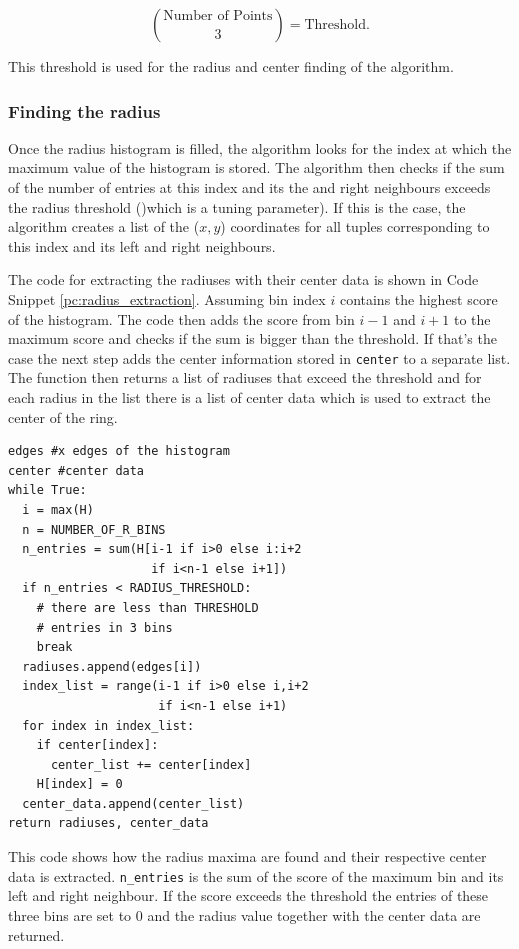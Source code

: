 \documentclass[11pt]{scrreprt}
\begin{document}
\begin{equation}
  \binom{\text{Number of Points}}{3} = \text{Threshold}.
  \label{eq:threshold}
\end{equation}

This threshold is used for the radius and center finding of the algorithm.

\subsubsection{Finding the radius} %
\label{ssub:finding_the_radius}
Once the radius histogram is filled, the algorithm looks for the index at which the maximum value of the histogram is stored. The algorithm
then checks if the sum of the number of entries at this index and its the and right neighbours exceeds the radius threshold ()which is a tuning parameter). If this is the case, the algorithm creates a list of the ($x,y$) coordinates for all tuples corresponding to this index and its left and right neighbours.

The code for extracting the radiuses with their center data is shown in Code Snippet \ref{pc:radius_extraction}. Assuming bin index $i$ 
contains the highest score of the histogram. The code then adds the score from bin $i-1$ and $i+1$ to the maximum score and checks if 
the sum is bigger than the threshold. If that's the case the next step adds the center information stored in \texttt{center} to a separate
list. The function then returns a list of radiuses that exceed the threshold and for each radius in the list there is a list of center data which is used to 
extract the center of the ring.
\begin{codesnippet}
  \begin{lstlisting}
edges #x edges of the histogram
center #center data
while True:
  i = max(H)
  n = NUMBER_OF_R_BINS 
  n_entries = sum(H[i-1 if i>0 else i:i+2 
                    if i<n-1 else i+1])
  if n_entries < RADIUS_THRESHOLD:
    # there are less than THRESHOLD
    # entries in 3 bins
    break
  radiuses.append(edges[i])
  index_list = range(i-1 if i>0 else i,i+2 
                     if i<n-1 else i+1)
  for index in index_list:
    if center[index]:
      center_list += center[index]
    H[index] = 0
  center_data.append(center_list)    
return radiuses, center_data 
\end{lstlisting}
\caption[Radius extraction algorithm]{This code shows how the radius maxima are found and their respective center data is extracted.
\texttt{n\_entries} is the sum of the score of the maximum bin and its left and right neighbour. If the score exceeds the threshold the entries of these three bins are set to 0 and the radius value together with the center data are returned.}\label{pc:radius_extraction}
\end{codesnippet}
\end{document}
